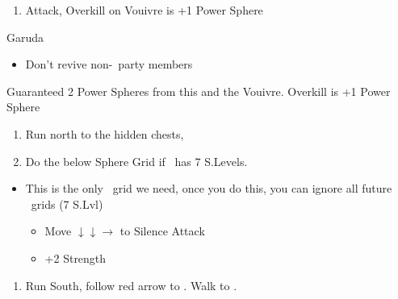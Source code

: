 \begin{enumerate}[resume]
    \item Attack, Overkill on Vouivre is +1 Power Sphere
\end{enumerate}
\begin{battle}[1800]{Garuda}
    \begin{itemize}
        \tidusf Haste \auron
        \auronf Attack x3
        \wakkaf Keep \tidus\ > 312 HP, Keep \auron\ > 202 HP
        \tidusf Attack x1, then Defend
        \auronf Attack x3
        \item Don't revive non-\auron\ party members
    \end{itemize}
    Guaranteed 2 Power Spheres from this and the Vouivre. Overkill is +1 Power Sphere
\end{battle}
\begin{enumerate}[resume]
    \item Run north to the hidden chests, 
    \item Do the below Sphere Grid if \wakka\ has 7 S.Levels.
\end{enumerate}
\begin{spheregrid}
    \begin{itemize}
        \item This is the only \wakka\ grid we need, once you do this, you can ignore all future \wakka\ grids
        \wakkaf (7 S.Lvl)
        \begin{itemize}
            \item Move $\downarrow\downarrow\rightarrow$ to Silence Attack
            \item +2 Strength
        \end{itemize}
    \end{itemize}
\end{spheregrid}
\begin{enumerate}[resume]
    \item Run South, follow red arrow to \yuna. Walk to \yuna.
\end{enumerate}
